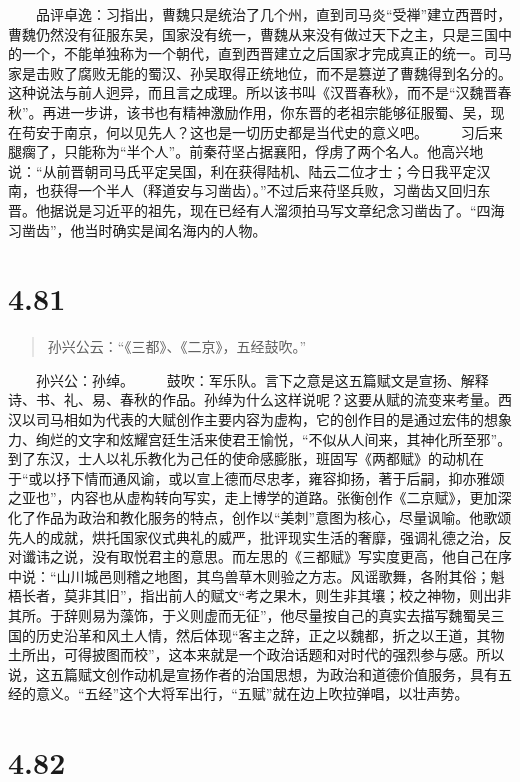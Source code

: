 \documentclass[]{book}
\begin{document}
　　品评卓逸：习指出，曹魏只是统治了几个州，直到司马炎``受禅''建立西晋时，曹魏仍然没有征服东吴，国家没有统一，曹魏从来没有做过天下之主，只是三国中的一个，不能单独称为一个朝代，直到西晋建立之后国家才完成真正的统一。司马家是击败了腐败无能的蜀汉、孙吴取得正统地位，而不是篡逆了曹魏得到名分的。这种说法与前人迥异，而且言之成理。所以该书叫《汉晋春秋》，而不是``汉魏晋春秋''。再进一步讲，该书也有精神激励作用，你东晋的老祖宗能够征服蜀、吴，现在苟安于南京，何以见先人？这也是一切历史都是当代史的意义吧。
　　习后来腿瘸了，只能称为``半个人''。前秦苻坚占据襄阳，俘虏了两个名人。他高兴地说：``从前晋朝司马氏平定吴国，利在获得陆机、陆云二位才士；今日我平定汉南，也获得一个半人（释道安与习凿齿）。''不过后来苻坚兵败，习凿齿又回归东晋。他据说是习近平的祖先，现在已经有人溜须拍马写文章纪念习凿齿了。``四海习凿齿''，他当时确实是闻名海内的人物。

\section{4.81}\label{section-258}

\begin{quote}
孙兴公云：``《三都》、《二京》，五经鼓吹。''
\end{quote}

　　孙兴公：孙绰。
　　鼓吹：军乐队。言下之意是这五篇赋文是宣扬、解释诗、书、礼、易、春秋的作品。孙绰为什么这样说呢？这要从赋的流变来考量。西汉以司马相如为代表的大赋创作主要内容为虚构，它的创作目的是通过宏伟的想象力、绚烂的文字和炫耀宫廷生活来使君王愉悦，``不似从人间来，其神化所至邪''。到了东汉，士人以礼乐教化为己任的使命感膨胀，班固写《两都赋》的动机在于``或以抒下情而通风谕，或以宣上德而尽忠孝，雍容抑扬，著于后嗣，抑亦雅颂之亚也''，内容也从虚构转向写实，走上博学的道路。张衡创作《二京赋》，更加深化了作品为政治和教化服务的特点，创作以``美刺''意图为核心，尽量讽喻。他歌颂先人的成就，烘托国家仪式典礼的威严，批评现实生活的奢靡，强调礼德之治，反对谶讳之说，没有取悦君主的意思。而左思的《三都赋》写实度更高，他自己在序中说：``山川城邑则稽之地图，其鸟兽草木则验之方志。风谣歌舞，各附其俗；魁梧长者，莫非其旧''，指出前人的赋文``考之果木，则生非其壤；校之神物，则出非其所。于辞则易为藻饰，于义则虚而无征''，他尽量按自己的真实去描写魏蜀吴三国的历史沿革和风土人情，然后体现``客主之辞，正之以魏都，折之以王道，其物土所出，可得披图而校''，这本来就是一个政治话题和对时代的强烈参与感。所以说，这五篇赋文创作动机是宣扬作者的治国思想，为政治和道德价值服务，具有五经的意义。``五经''这个大将军出行，``五赋''就在边上吹拉弹唱，以壮声势。

\section{4.82}\label{section-259}
\end{document}
